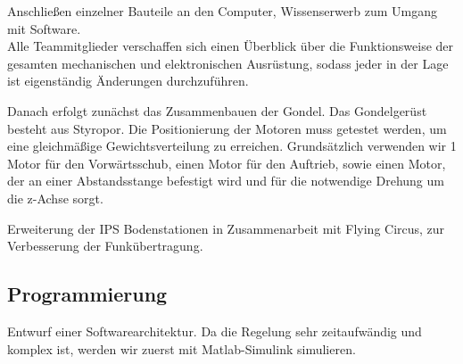 \documentclass[lang=ngerman,inputenc=utf8,fontsize=10pt]{ldvarticle}
\begin{document}
Anschließen einzelner Bauteile an den Computer, Wissenserwerb zum Umgang mit Software.\\
Alle Teammitglieder verschaffen sich einen Überblick über die Funktionsweise der gesamten mechanischen und elektronischen Ausrüstung, sodass jeder in der Lage ist eigenständig Änderungen durchzuführen.

Danach erfolgt zunächst das Zusammenbauen der Gondel. Das Gondelgerüst besteht aus Styropor. Die Positionierung der Motoren muss getestet werden, um eine gleichmäßige Gewichtsverteilung zu erreichen. Grundsätzlich verwenden wir 1 Motor für den Vorwärtsschub, einen Motor für den Auftrieb, sowie einen Motor, der an einer Abstandsstange befestigt wird und für die notwendige Drehung um die z-Achse sorgt.

Erweiterung der IPS Bodenstationen in Zusammenarbeit mit Flying Circus, zur Verbesserung der Funkübertragung. 

\subsection*{Programmierung}
Entwurf einer Softwarearchitektur.
Da die Regelung sehr zeitaufwändig und komplex ist, werden wir zuerst mit Matlab-Simulink simulieren.
\end{document}

